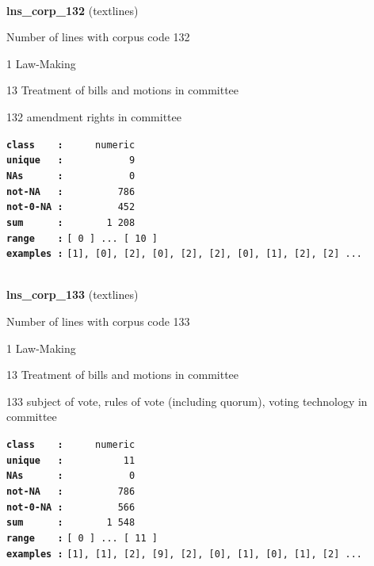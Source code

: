 \documentclass[]{article}
\begin{document}
~

\textbf{lns\_corp\_132} (textlines)

Number of lines with corpus code 132

1 Law-Making

13 Treatment of bills and motions in committee

132 amendment rights in committee

\textbf{\texttt{class\ \ \ \ :}} \texttt{~~~~~numeric}\\
\textbf{\texttt{unique\ \ \ :}} \texttt{~~~~~~~~~~~9}\\
\textbf{\texttt{NAs\ \ \ \ \ \ :}} \texttt{~~~~~~~~~~~0}\\
\textbf{\texttt{not-NA\ \ \ :}} \texttt{~~~~~~~~~786}\\
\textbf{\texttt{not-0-NA\ :}} \texttt{~~~~~~~~~452}\\
\textbf{\texttt{sum\ \ \ \ \ \ :}} \texttt{~~~~~~~1~208}\\
\textbf{\texttt{range\ \ \ \ :}}
\texttt{{[}\ 0\ {]}\ ...\ {[}\ 10\ {]}}\\
\textbf{\texttt{examples\ :}}
\texttt{{[}1{]},\ {[}0{]},\ {[}2{]},\ {[}0{]},\ {[}2{]},\ {[}2{]},\ {[}0{]},\ {[}1{]},\ {[}2{]},\ {[}2{]}\ ...}\\

~

\textbf{lns\_corp\_133} (textlines)

Number of lines with corpus code 133

1 Law-Making

13 Treatment of bills and motions in committee

133 subject of vote, rules of vote (including quorum), voting technology
in committee

\textbf{\texttt{class\ \ \ \ :}} \texttt{~~~~~numeric}\\
\textbf{\texttt{unique\ \ \ :}} \texttt{~~~~~~~~~~11}\\
\textbf{\texttt{NAs\ \ \ \ \ \ :}} \texttt{~~~~~~~~~~~0}\\
\textbf{\texttt{not-NA\ \ \ :}} \texttt{~~~~~~~~~786}\\
\textbf{\texttt{not-0-NA\ :}} \texttt{~~~~~~~~~566}\\
\textbf{\texttt{sum\ \ \ \ \ \ :}} \texttt{~~~~~~~1~548}\\
\textbf{\texttt{range\ \ \ \ :}}
\texttt{{[}\ 0\ {]}\ ...\ {[}\ 11\ {]}}\\
\textbf{\texttt{examples\ :}}
\texttt{{[}1{]},\ {[}1{]},\ {[}2{]},\ {[}9{]},\ {[}2{]},\ {[}0{]},\ {[}1{]},\ {[}0{]},\ {[}1{]},\ {[}2{]}\ ...}\\
\end{document}
